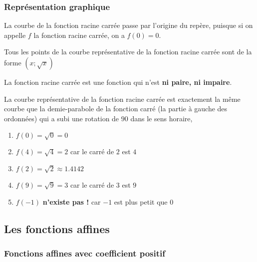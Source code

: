\documentclass[11pt]{article}
\begin{document}
\subsubsection{Représentation graphique}
\label{sec:orgf608aa7}
\begin{center}
\end{center}
\begin{prop}

  La courbe de la fonction racine carrée passe par l'origine du repère, puisque si on appelle $f$ la
  fonction racine carrée, on a $f(0) = 0$.

  Tous les points de la courbe représentative de la fonction racine carrée sont de la forme
  $(x; \sqrt{x})$

  La fonction racine carrée est une fonction qui n'est \textbf{ni paire, ni impaire}.

  La courbe représentative de la fonction racine carrée est exactement la même
  courbe que la demie-parabole de la fonction carré (la partie à gauche des
  ordonnées) qui a subi une rotation de $90$ dans le sens horaire,

\end{prop}

\begin{ex}
\begin{enumerate}
\item \(f(0) = \sqrt{0} = 0\)
\item \(f(4) = \sqrt{4} = 2\) car le carré de \(2\) est \(4\)
\item \(f(2) = \sqrt{2} \approx 1.4142\)
\item \(f(9) = \sqrt{9} = 3\) car le carré de \(3\) est \(9\)
\item \(f(-1)\) \textbf{n'existe pas !} car \(-1\) est plus petit que \(0\)
\end{enumerate}
\end{ex}

\subsection{Les fonctions affines}
\label{sec:org8cd519e}
\subsubsection{Fonctions affines avec coefficient positif}
\label{sec:orgf67fb8e}
\begin{center}
\end{center}
\end{document}
